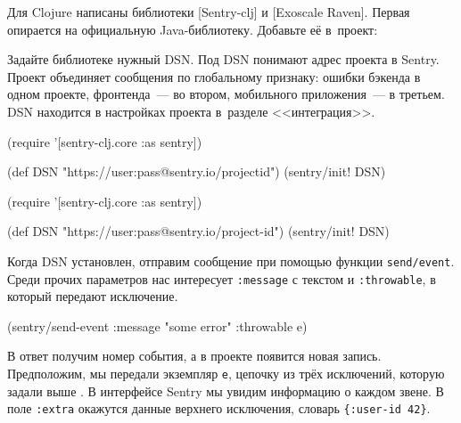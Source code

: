 Для Clojure написаны библиотеки
[Sentry-clj] и
[Exoscale Raven].
Первая опирается на официальную Java-библиотеку. Добавьте её в~проект:

\begin{english}
  \begin{clojure}
  \end{clojure}
\end{english}


Задайте библиотеке нужный DSN. Под DSN понимают адрес проекта в Sentry. Проект
объединяет сообщения по глобальному признаку: ошибки бэкенда в одном проекте,
фронтенда~--- во втором, мобильного приложения~--- в третьем. DSN находится в
настройках проекта в~разделе <<интеграция>>.

\ifnarrow

\begin{english}
  \begin{clojure}
(require '[sentry-clj.core :as sentry])

(def DSN
 "https://user:pass@sentry.io/projectid")
(sentry/init! DSN)
  \end{clojure}
\end{english}

\else

\begin{english}
  \begin{clojure}
(require '[sentry-clj.core :as sentry])

(def DSN "https://user:pass@sentry.io/project-id")
(sentry/init! DSN)
  \end{clojure}
\end{english}

\fi

Когда DSN установлен, отправим сообщение при помощью функции
\texttt{send\-/event}. Среди прочих параметров нас интересует \verb|:message| с
текстом и \verb|:throwable|, в который передают исключение.

\begin{english}
  \begin{clojure}
(sentry/send-event {:message "some error"
                    :throwable e})
  \end{clojure}
\end{english}

В ответ получим номер события, а в проекте появится новая запись. Предположим,
мы передали экземпляр \verb|e|, цепочку из трёх исключений, которую задали
выше . В интерфейсе Sentry мы увидим информацию о каждом звене. В
поле \verb|:extra| окажутся данные верхнего исключения, словарь
\verb|{:user-id 42}|.

